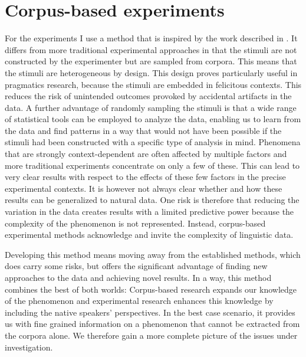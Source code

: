\section{Corpus-based experiments}\label{sec:expcorp}

For the experiments I use a method that is  inspired by the work described in \citet{Degen2015}. It differs from more traditional experimental approaches in that the stimuli are not constructed by the experimenter but are sampled from corpora. This means that the stimuli are heterogeneous by design. This design proves particularly useful in pragmatics research, because the stimuli are embedded in felicitous contexts. This reduces the risk of unintended outcomes provoked by accidental artifacts in the data. A further advantage of randomly sampling the stimuli is that a wide range of statistical tools can be employed to analyze the data,  enabling us to learn from the data and find patterns in a way that would not have been possible if the stimuli had been constructed with a specific type of analysis in mind. Phenomena that are strongly context-dependent are often affected by  multiple factors and more traditional experiments  concentrate on only a few of these. This can  lead to very clear results with respect to the effects of these few factors in the precise experimental contexts. It is however not always clear whether and how these results can be generalized to natural data. One risk is therefore that reducing the variation in the data creates results with a  limited predictive power  because the complexity of the phenomenon is not represented. Instead, corpus-based experimental methods acknowledge and invite  the complexity of linguistic data.

Developing this method means moving away from the established methods, which does carry some risks, but offers the significant advantage of finding new approaches to the data and  achieving novel results. In a way, this method combines the best of both worlds: Corpus-based research  expands our knowledge of the phenomenon and experimental research enhances this knowledge by including the native speakers' perspectives. In the best case scenario, it provides us with fine grained information on a phenomenon that cannot be extracted from the corpora alone. We therefore gain  a more complete picture of the issues under investigation.

